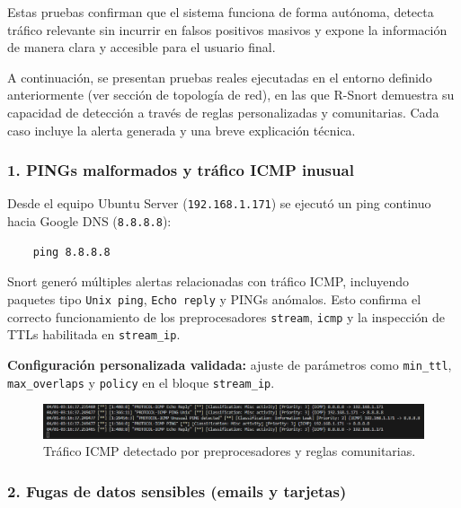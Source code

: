 \documentclass[11pt,a4paper,twoside]{report}
\begin{document}
Estas pruebas confirman que el sistema funciona de forma autónoma, detecta tráfico relevante sin incurrir en falsos positivos masivos y expone la información de manera clara y accesible para el usuario final.\newline

A continuación, se presentan pruebas reales ejecutadas en el entorno definido anteriormente (ver sección de topología de red), en las que R-Snort demuestra su capacidad de detección a través de reglas personalizadas y comunitarias. Cada caso incluye la alerta generada y una breve explicación técnica.

\vspace{0.5cm}

\subsubsection*{1. PINGs malformados y tráfico ICMP inusual}

Desde el equipo Ubuntu Server (\texttt{192.168.1.171}) se ejecutó un ping continuo hacia Google DNS (\texttt{8.8.8.8}):

\begin{verbatim}
	ping 8.8.8.8
\end{verbatim}

Snort generó múltiples alertas relacionadas con tráfico ICMP, incluyendo paquetes tipo \texttt{Unix ping}, \texttt{Echo reply} y PINGs anómalos. Esto confirma el correcto funcionamiento de los preprocesadores \texttt{stream}, \texttt{icmp} y la inspección de TTLs habilitada en \texttt{stream\_ip}.\newline

\textbf{Configuración personalizada validada:} ajuste de parámetros como \texttt{min\_ttl}, \texttt{max\_overlaps} y \texttt{policy} en el bloque \texttt{stream\_ip}.

\begin{figure}[H]
	\centering
	\includegraphics[width=\textwidth]{pruebas/3.png}
	\caption{Tráfico ICMP detectado por preprocesadores y reglas comunitarias.}
\end{figure}

\vspace{0.5cm}

\subsubsection*{2. Fugas de datos sensibles (emails y tarjetas)}
\end{document}
